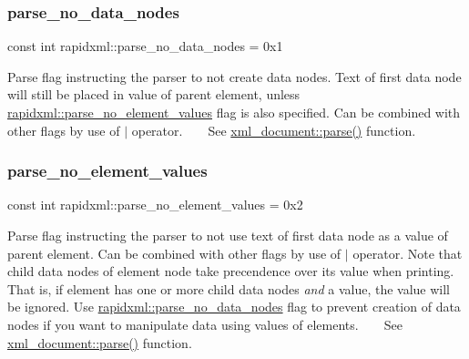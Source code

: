 \subsubsection{\texorpdfstring{parse\+\_\+no\+\_\+data\+\_\+nodes}{parse\_no\_data\_nodes}}
{\footnotesize\ttfamily const int rapidxml\+::parse\+\_\+no\+\_\+data\+\_\+nodes = 0x1}

Parse flag instructing the parser to not create data nodes. Text of first data node will still be placed in value of parent element, unless \mbox{\hyperlink{namespacerapidxml_a00e6fea134b786ea6efeed1c8bc4a668}{rapidxml\+::parse\+\_\+no\+\_\+element\+\_\+values}} flag is also specified. Can be combined with other flags by use of $\vert$ operator. ~\newline
~\newline
 See \mbox{\hyperlink{classrapidxml_1_1xml__document_ac6e73ff9ac323bf5a370c38feb03a6b1}{xml\+\_\+document\+::parse()}} function. \mbox{\label{namespacerapidxml_a00e6fea134b786ea6efeed1c8bc4a668}} 
\subsubsection{\texorpdfstring{parse\+\_\+no\+\_\+element\+\_\+values}{parse\_no\_element\_values}}
{\footnotesize\ttfamily const int rapidxml\+::parse\+\_\+no\+\_\+element\+\_\+values = 0x2}

Parse flag instructing the parser to not use text of first data node as a value of parent element. Can be combined with other flags by use of $\vert$ operator. Note that child data nodes of element node take precendence over its value when printing. That is, if element has one or more child data nodes {\itshape and} a value, the value will be ignored. Use \mbox{\hyperlink{namespacerapidxml_ac2d21ef14a4e8936b94aca5d38b1a74d}{rapidxml\+::parse\+\_\+no\+\_\+data\+\_\+nodes}} flag to prevent creation of data nodes if you want to manipulate data using values of elements. ~\newline
~\newline
 See \mbox{\hyperlink{classrapidxml_1_1xml__document_ac6e73ff9ac323bf5a370c38feb03a6b1}{xml\+\_\+document\+::parse()}} function. \mbox{\label{namespacerapidxml_a89113c103ffaf77615d1aa330c8dcca8}} 
